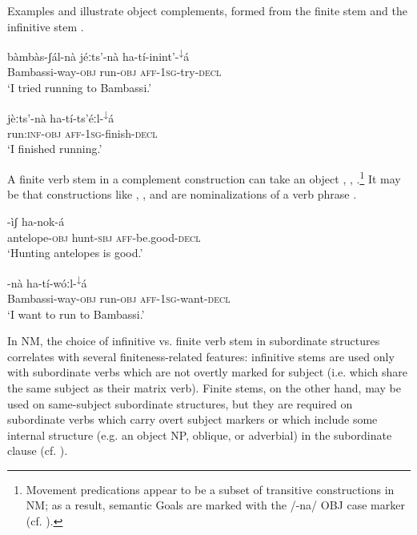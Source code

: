 \documentclass[output=paper]{langsci/langscibook}
\begin{document}
Examples  and  illustrate object complements, formed from the finite stem  and the infinitive stem . 

\ea\label{ex:mahland:36}
\gll b\`{a}mb\`{a}s-ʃ\'{a}l-n\`{a}            j\'{e}ːts'-n\`{a}    ha-t\'{i}-inint'-\textsuperscript{↓}\'{a}\\
Bambassi-way-\textsc{obj}    run\textsc{{}-obj}     \textsc{aff-1sg}{}-try\textsc{{}-decl }\\
\glt `I tried running to Bambassi.'
\z

\ea\label{ex:mahland:37}
\gll j\`{e}ːts'-n\`{a}        ha-t\'{i}-ts'\'{e}ːl-\textsuperscript{↓}\'{a}\\
run:\textsc{inf-obj   aff-1sg}{}-finish-\textsc{decl} \\
\glt `I finished running.'
\z

A finite verb stem in a complement construction can take an object , , .\footnote{Movement predications appear to be a subset of transitive constructions in NM; as a result, semantic Goals are marked with the /-na/ OBJ case marker (cf. \citealt[335-339]{Ahland2012}).} It may be that constructions like , , and  are nominalizations of a verb phrase \citep[625]{Ahland2012}.

\ea\label{ex:mahland:38}
\gll [p\`{a}l-l\`{a}             kj\'{a}mb]-\`{i}ʃ     ha-nok-\'{a} \\
antelope\textsc{{}-obj}    hunt\textsc{{}-sbj}       \textsc{aff-}be.good\textsc{{}-decl }\\
\glt `Hunting antelopes is good.'
\z

\ea\label{ex:mahland:39}
\gll [b\`{a}mb\`{a}s-ʃ\'{a}l-n\`{a}          j\'{e}ːts']-n\`{a}    ha-t\'{i}-w\'{o}ːl-\textsuperscript{↓}\'{a}\\
Bambassi-way\textsc{{}-obj}     run\textsc{{}-obj}      \textsc{aff-1sg}{}-want\textsc{{}-decl }\\
\glt `I want to run to Bambassi.'
\z

In NM, the choice of infinitive vs. finite verb stem in subordinate structures correlates with several finiteness-related features: infinitive stems are used only with subordinate verbs which are not overtly marked for subject (i.e. which share the same subject as their matrix verb). Finite stems, on the other hand, may be used on same-subject subordinate structures, but they are required on subordinate verbs which carry overt subject markers or which include some internal structure (e.g. an object NP, oblique, or adverbial) in the subordinate clause (cf. \citealt[612, 630]{Ahland:2012}). 
\end{document}
